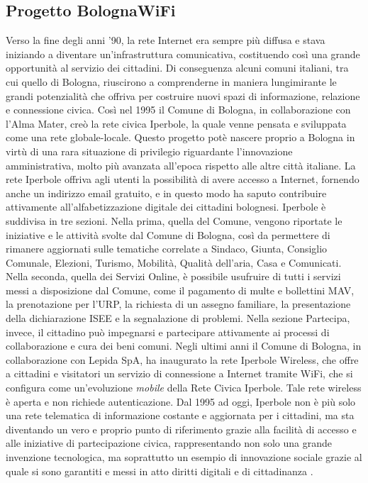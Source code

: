 \subsection{Progetto BolognaWiFi}
Verso la fine degli anni '90, la rete Internet era sempre più diffusa e stava iniziando a diventare un'infrastruttura comunicativa, costituendo così una grande opportunità al servizio dei cittadini. Di conseguenza alcuni comuni italiani, tra cui quello di Bologna, riuscirono a comprenderne in maniera lungimirante le grandi potenzialità che offriva per costruire nuovi spazi di informazione, relazione e connessione civica.
Così nel 1995 il Comune di Bologna, in collaborazione con l'Alma Mater, creò la rete civica Iperbole, la quale venne pensata e sviluppata come una rete globale-locale. Questo progetto potè nascere proprio a Bologna in virtù di una rara situazione di privilegio riguardante l'innovazione amministrativa, molto più avanzata all'epoca rispetto alle altre città italiane.
La rete Iperbole offriva agli utenti la possibilità di avere accesso a Internet, fornendo anche un indirizzo email gratuito, e in questo modo ha saputo contribuire attivamente all'alfabetizzazione digitale dei cittadini bolognesi.
Iperbole è suddivisa in tre sezioni. Nella prima, quella del Comune, vengono riportate le iniziative e le attività svolte dal Comune di Bologna, così da permettere di rimanere aggiornati sulle tematiche correlate a Sindaco, Giunta, Consiglio Comunale, Elezioni, Turismo, Mobilità, Qualità dell'aria, Casa e Comunicati.
Nella seconda, quella dei Servizi Online, è possibile usufruire di tutti i servizi messi a disposizione dal Comune, come il pagamento di multe e bollettini MAV, la prenotazione per l'URP, la richiesta di un assegno familiare, la presentazione della dichiarazione ISEE e la segnalazione di problemi.
Nella sezione Partecipa, invece, il cittadino può impegnarsi e partecipare attivamente ai processi di collaborazione e cura dei beni comuni.
Negli ultimi anni il Comune di Bologna, in collaborazione con Lepida SpA, ha inaugurato la rete Iperbole Wireless, che offre a cittadini e visitatori un servizio di connessione a Internet tramite WiFi, che si configura come un'evoluzione \textit{mobile} della Rete Civica Iperbole. Tale rete wireless è aperta e non richiede autenticazione.
Dal 1995 ad oggi, Iperbole non è più solo una rete telematica di informazione costante e aggiornata per i cittadini, ma sta diventando un vero e proprio punto di riferimento grazie alla facilità di accesso e alle iniziative di partecipazione civica, rappresentando non solo una grande invenzione tecnologica, ma soprattutto un esempio di innovazione sociale grazie al quale si sono garantiti e messi in atto diritti digitali e di cittadinanza \cite{Iperbole_Citta_Connessa}.

